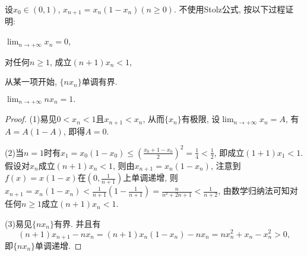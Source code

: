 \begin{quizb}
\woe 设\(x_0\in (0,1),\, x_{n+1}=x_n(1-x_n)(n\geqslant 0)\). 不使用Stolz公式, 按以下过程证明:
\begin{quizcs}
  \item \(\lim_{n\rightarrow+\infty}x_n=0\),
  \item 对任何\(n\geqslant 1\), 成立\((n+1)x_n<1\),
  \item 从某一项开始, \(\{nx_n\}\)单调有界.
  \item \(\lim_{n\rightarrow+\infty}nx_n=1.\)
\end{quizcs}
\begin{proof}
(1)易见\(0<x_n<1\)且\(x_{n+1}<x_n\), 从而\(\{x_n\}\)有极限, 设\(\lim_{n\rightarrow+\infty}x_n=A\), 有\(A=A(1-A)\), 即得\(A=0\).

(2)当\(n=1\)时有\(x_1=x_0(1-x_0)\leqslant\left(\frac{x_0+1-x_0}{2}\right)^2=\frac{1}{4}<\frac{1}{2}\), 即成立\((1+1)x_1<1\). 假设对\(x_n\)成立\((n+1)x_n<1\), 则由\(x_{n+1}=x_n(1-x_n)\), 注意到\(f(x)=x(1-x)\)在\(\left(0,\frac{1}{n+1}\right)\)上单调递增, 则\(x_{n+1}=x_n(1-x_n)<\frac{1}{n+1}\left(1-\frac{1}{n+1}\right)=\frac{n}{n^2+2n+1}<\frac{1}{n+2}\), 由数学归纳法可知对任何\(n\geqslant 1\)成立\((n+1)x_n<1\).

(3)易见\(\{nx_n\}\)有界. 并且有\[(n+1)x_{n+1}-nx_n=(n+1)x_n(1-x_n)-nx_n=nx_n^2+x_n-x_n^2>0,\]即\(\{nx_n\}\)单调递增.


\end{proof}
\end{quizb}
